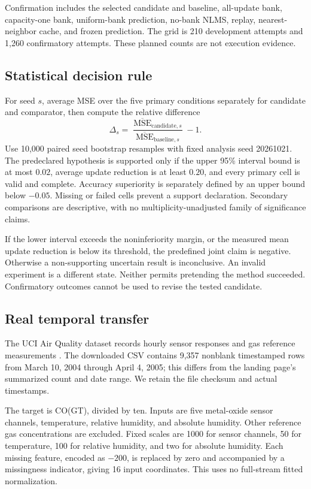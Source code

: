 \documentclass[10pt]{article}
\begin{document}
Confirmation includes the selected candidate and baseline, all-update bank, capacity-one bank, uniform-bank prediction, no-bank NLMS, replay, nearest-neighbor cache, and frozen prediction. The grid is 210 development attempts and 1,260 confirmatory attempts. These planned counts are not execution evidence.

\subsection{Statistical decision rule}
For seed $s$, average MSE over the five primary conditions separately for candidate and comparator, then compute the relative difference
\[
 \Delta_s=\frac{\overline{\operatorname{MSE}}_{\mathrm{candidate},s}}
 {\overline{\operatorname{MSE}}_{\mathrm{baseline},s}}-1.
\]
Use 10,000 paired seed bootstrap resamples with fixed analysis seed 20261021. The predeclared hypothesis is supported only if the upper 95\% interval bound is at most $0.02$, average update reduction is at least $0.20$, and every primary cell is valid and complete. Accuracy superiority is separately defined by an upper bound below $-0.05$. Missing or failed cells prevent a support declaration. Secondary comparisons are descriptive, with no multiplicity-unadjusted family of significance claims.

If the lower interval exceeds the noninferiority margin, or the measured mean update reduction is below its threshold, the predefined joint claim is negative. Otherwise a non-supporting uncertain result is inconclusive. An invalid experiment is a different state. Neither permits pretending the method succeeded. Confirmatory outcomes cannot be used to revise the tested candidate.

\subsection{Real temporal transfer}
The UCI Air Quality dataset records hourly sensor responses and gas reference measurements \cite{uci}. The downloaded CSV contains 9,357 nonblank timestamped rows from March 10, 2004 through April 4, 2005; this differs from the landing page's summarized count and date range. We retain the file checksum and actual timestamps.

The target is CO(GT), divided by ten. Inputs are five metal-oxide sensor channels, temperature, relative humidity, and absolute humidity. Other reference gas concentrations are excluded. Fixed scales are 1000 for sensor channels, 50 for temperature, 100 for relative humidity, and two for absolute humidity. Each missing feature, encoded as $-200$, is replaced by zero and accompanied by a missingness indicator, giving 16 input coordinates. This uses no full-stream fitted normalization.
\end{document}
